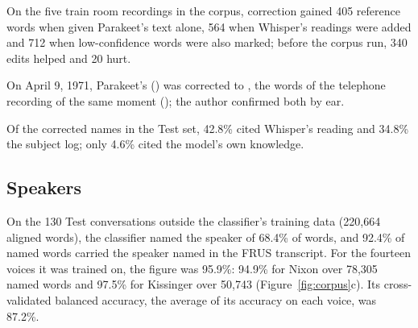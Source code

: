  On the five train room recordings in the corpus, correction gained 405 reference words when given Parakeet's text alone, 564 when Whisper's readings were added and 712 when low-confidence words were also marked; before the corpus run, 340 edits helped and 20 hurt.

 On April 9, 1971, Parakeet's  () was corrected to , the words of the telephone recording of the same moment (); the author confirmed both by ear.

 Of the corrected names in the Test set, 42.8\% cited Whisper's reading and 34.8\% the subject log; only 4.6\% cited the model's own knowledge.

\subsection{Speakers}
\label{sec:res-speakers}

On the 130 Test conversations outside the classifier's training data (220,664 aligned words), the classifier named the speaker of 68.4\% of words, and 92.4\% of named words carried the speaker named in the FRUS transcript. For the fourteen voices it was trained on, the figure was 95.9\%: 94.9\% for Nixon over 78,305 named words and 97.5\% for Kissinger over 50,743 (Figure~\ref{fig:corpus}c). Its cross-validated balanced accuracy, the average of its accuracy on each voice, was 87.2\%.
